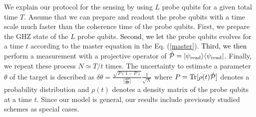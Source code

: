 \documentclass[prl,twocolumn,superscriptaddress]{revtex4}
\begin{document}
We explain our protocol for the sensing by using
$L$ probe qubits for a given total time $T$. Assume that we can
prepare and readout the probe qubits with a time scale much faster than the
coherence time of the probe qubits.
First, we prepare the GHZ state of the $L$ probe
qubits. \textcolor{black}{Second, we let} the probe qubits evolves for a time $t$ according
to the master equation in the Eq. (\ref{master}).
\textcolor{black}{Third, we then} perform a measurement with a projective operator of
$\hat{\mathcal{P}}=|\psi _{\rm{read}} \rangle \langle \psi _{\rm{read}}|$.
 Finally, we repeat these process
$N\simeq T/t$ times.
The uncertainty to estimate a parameter $\theta $ of the target
is described as $\delta \theta =\frac{\sqrt{P(1-P)}}{|\frac{dP}{d\theta }|}\frac{1}{\sqrt{N}}$
\cite{huelga1997improvement}
where $P={\rm{Tr}}[\rho (t)\hat{\mathcal{P}}]$ denotes a probability
distribution and $\rho (t)$ denotes a density matrix of the probe qubits
at a time $t$.
Since our model is
general, our results include previously studied schemes
\cite{huelga1997improvement,matsuzaki2011magnetic,chin2012quantum,tanaka2015proposed} as special cases.
\end{document}
